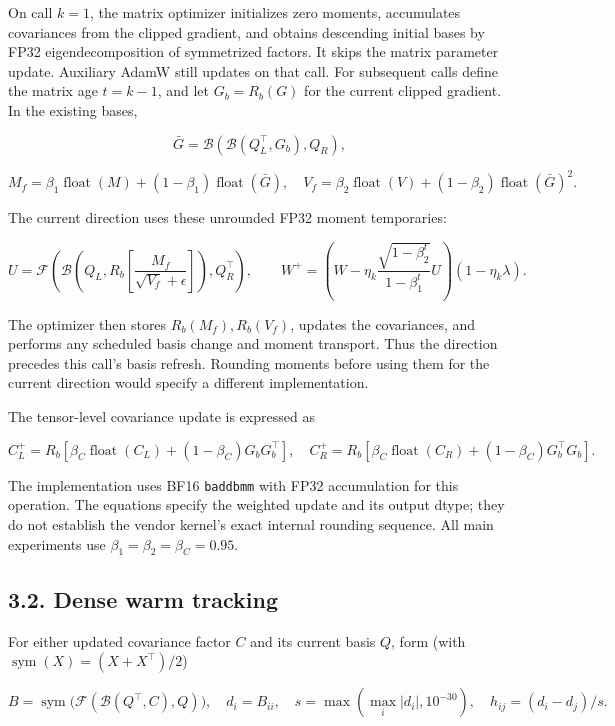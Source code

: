 \documentclass[
  10pt,
]{article}
\begin{document}
On call \(k=1\), the matrix optimizer initializes zero moments,
accumulates covariances from the clipped gradient, and obtains
descending initial bases by FP32 eigendecomposition of symmetrized
factors. It skips the matrix parameter update. Auxiliary AdamW still
updates on that call. For subsequent calls define the matrix age
\(t=k-1\), and let \(G_b=R_b(G)\) for the current clipped gradient. In
the existing bases,

\[
\bar G=\mathcal B(\mathcal B(Q_L^\top,G_b),Q_R),
\]

\[
M_f=\beta_1\operatorname{float}(M)+(1-\beta_1)\operatorname{float}(\bar G),
\quad
V_f=\beta_2\operatorname{float}(V)+(1-\beta_2)\operatorname{float}(\bar G)^2.
\]

The current direction uses these unrounded FP32 moment temporaries:

\[
U=\mathcal F\!\left(\mathcal B\!\left(Q_L,
 R_b\!\left[\frac{M_f}{\sqrt{V_f}+\epsilon}\right]\right),Q_R^\top\right),
\qquad
W^+=\left(W-\eta_k\frac{\sqrt{1-\beta_2^t}}{1-\beta_1^t}U\right)
 (1-\eta_k\lambda).
\]

The optimizer then stores \(R_b(M_f),R_b(V_f)\), updates the
covariances, and performs any scheduled basis change and moment
transport. Thus the direction precedes this call's basis refresh.
Rounding moments before using them for the current direction would
specify a different implementation.

The tensor-level covariance update is expressed as

\[
C_L^+=R_b\!\left[\beta_C\operatorname{float}(C_L)
 +(1-\beta_C)G_bG_b^\top\right],
\quad
C_R^+=R_b\!\left[\beta_C\operatorname{float}(C_R)
 +(1-\beta_C)G_b^\top G_b\right].
\]

The implementation uses BF16 \texttt{baddbmm} with FP32 accumulation for
this operation. The equations specify the weighted update and its output
dtype; they do not establish the vendor kernel's exact internal rounding
sequence. All main experiments use \(\beta_1=\beta_2=\beta_C=0.95\).

\hypertarget{dense-warm-tracking}{%
\subsection{3.2. Dense warm tracking}\label{dense-warm-tracking}}

For either updated covariance factor \(C\) and its current basis \(Q\),
form (with \(\operatorname{sym}(X)=(X+X^\top)/2\))

\[
B=\operatorname{sym}\bigl(\mathcal F(\mathcal B(Q^\top,C),Q)\bigr),
\quad d_i=B_{ii},\quad
s=\max(\max_i|d_i|,10^{-30}),\quad h_{ij}=(d_i-d_j)/s.
\]
\end{document}
